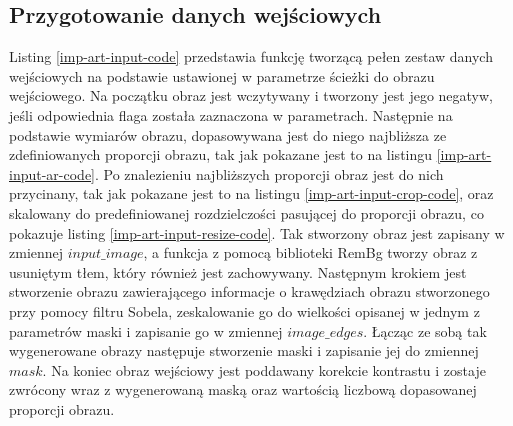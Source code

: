         \subsection{Przygotowanie danych wejściowych} \label{imp-art-prep-in}
        Listing \ref{imp-art-input-code} przedstawia funkcję tworzącą pełen zestaw danych wejściowych na podstawie ustawionej w parametrze ścieżki do obrazu wejściowego. Na początku obraz jest wczytywany i tworzony jest jego negatyw, jeśli odpowiednia flaga została zaznaczona w parametrach. Następnie na podstawie wymiarów obrazu, dopasowywana jest do niego najbliższa ze zdefiniowanych proporcji obrazu, tak jak pokazane jest to na listingu \ref{imp-art-input-ar-code}. Po znalezieniu najbliższych proporcji obraz jest do nich przycinany, tak jak pokazane jest to na listingu \ref{imp-art-input-crop-code}, oraz skalowany do predefiniowanej rozdzielczości pasującej do proporcji obrazu, co pokazuje listing \ref{imp-art-input-resize-code}. Tak stworzony obraz jest zapisany w zmiennej \(input\_image\), a funkcja z pomocą biblioteki RemBg tworzy obraz z usuniętym tłem, który również jest zachowywany. Następnym krokiem jest stworzenie obrazu zawierającego informacje o krawędziach obrazu stworzonego przy pomocy filtru Sobela, zeskalowanie go do wielkości opisanej w jednym z parametrów maski i zapisanie go w zmiennej \(image\_edges\). Łącząc ze sobą tak wygenerowane obrazy następuje stworzenie maski i zapisanie jej do zmiennej \(mask\). Na koniec obraz wejściowy jest poddawany korekcie kontrastu i zostaje zwrócony wraz z wygenerowaną maską oraz wartością liczbową dopasowanej proporcji obrazu.
